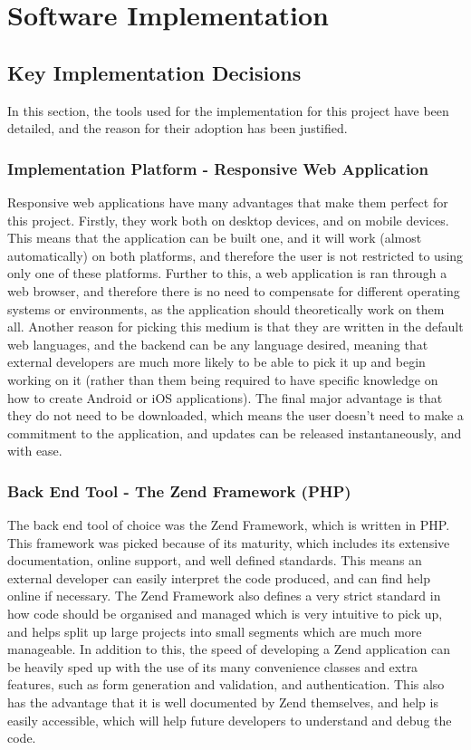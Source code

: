 \section{Software Implementation}

\subsection{Key Implementation Decisions}
\label{sec:kid}
In this section, the tools used for the implementation for this project have been detailed, and the reason for their adoption has been justified.
\subsubsection{Implementation Platform - Responsive Web Application}
Responsive web applications have many advantages that make them perfect for this project. Firstly, they work both on desktop devices, and on mobile devices. This means that the application can be built one, and it will work (almost automatically) on both platforms, and therefore the user is not restricted to using only one of these platforms. Further to this, a web application is ran through a web browser, and therefore there is no need to compensate for different operating systems or environments, as the application should theoretically work on them all. Another reason for picking this medium is that they are written in the default web languages, and the backend can be any language desired, meaning that external developers are much more likely to be able to pick it up and begin working on it (rather than them being required to have specific knowledge on how to create Android or iOS applications). The final major advantage is that they do not need to be downloaded, which means the user doesn't need to make a commitment to the application, and updates can be released instantaneously, and with ease. 

\subsubsection{Back End Tool - The Zend Framework (PHP)}
The back end tool of choice was the Zend Framework, which is written in PHP. This framework was picked because of its maturity, which includes its extensive documentation, online support, and well defined standards. This means an external developer can easily interpret the code produced, and can find help online if necessary. The Zend Framework also defines a very strict standard in how code should be organised and managed which is very intuitive to pick up, and helps split up large projects into small segments which are much more manageable. In addition to this, the speed of developing a Zend application can be heavily sped up with the use of its many convenience classes and extra features, such as form generation and validation, and authentication. This also has the advantage that it is well documented by Zend themselves, and help is easily accessible, which will help future developers to understand and debug the code.

